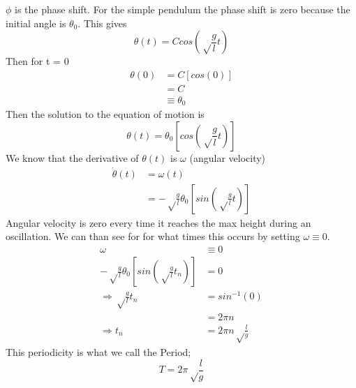 \documentclass[iop]{emulateapj}
\begin{document}
$\phi$ is the phase shift. For the simple pendulum the phase shift is zero 
because the initial angle is $\theta_0$. This gives\\
\begin{equation*}
\theta(t) = Ccos(\sqrt\frac{g}{l}t)
\end{equation*}
Then for t = 0
\begin{align*}
\theta(0) & = C[cos(0)]\\
& = C\\
& \equiv \theta_0
\end{align*}
Then the solution to the equation of motion is
\begin{equation}
\boxed{\theta(t) = \theta_0[cos(\sqrt\frac{g}{l}t)]}
\end{equation}
We know that the derivative of $\theta(t)$ is $\omega$ (angular velocity)
\begin{align*}
\dot{\theta}(t) & = \omega(t)\\
& = -\sqrt\frac{g}{l}\theta_0[sin(\sqrt\frac{g}{l}t)]
\end{align*}
Angular velocity is zero every time it reaches the max height during an oscillation. We can than see for
for what times this occurs by setting $\omega \equiv 0$.
\begin{align*}
\omega & \equiv 0\\
-\sqrt\frac{g}{l}\theta_0[sin(\sqrt\frac{g}{l}t_n)] & = 0\\
\Rightarrow \sqrt\frac{g}{l}t_n & = sin^{-1}(0)\\
& = 2\pi n\\
\Rightarrow t_n & = 2\pi n\sqrt\frac{l}{g}
\end{align*}
This periodicity is what we call the Period;
\begin{equation}
\boxed{T = 2\pi \sqrt\frac{l}{g}}
\end{equation}
\end{document}
